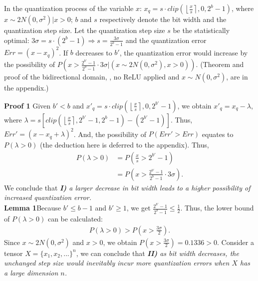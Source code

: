 \begin{theorem} 
In the quantization process of the variable $x$: $x_q = s\cdot clip(\left\lfloor\frac{x}{s}\right\rceil,0,2^b-1)$, where $x\sim 2N(0,\sigma^2)|  x>0$; $b$ and $s$ respectively denote the bit width and the quantization step size.  
Let the quantization step size $s$ be the statistically optimal: $3\sigma=s\cdot(2^b-1)\Rightarrow s=\frac{3\sigma}{2^b-1}$ and the quantization error $Err=(x-x_q)^2$. If $b$ decreases to $b'$, the quantization error would  
increase by the possibility of $P(x>\frac{2^{b'}-1}{2^{b}-1}\cdot3\sigma| (x\sim 2N(0,\sigma^2),  x>0)) $. 
(Theorem and proof of the bidirectional domain, \ie, no ReLU applied and $x\sim N(0,\sigma^2)$, are in the appendix.)
\end{theorem}
\textbf{Proof 1}\quad
Given $b'<b$ and $x'_q=s\cdot  clip(\left\lfloor\frac{x}{s}\right\rceil,0,2^{b'}-1)$, we obtain $x'_q = x_q - \lambda$, where  $\lambda=s[clip(\left\lfloor\frac{x}{s}\right\rceil,2^{b'}-1,2^b-1)-(2^{b'}-1)]$. Thus, $Err'=(x-x_q+\lambda)^2$. And, the possibility of $P(Err'>Err)$ equates to $P(\lambda > 0)$ (the deduction here is deferred to the appendix). Thus, 
\begin{equation}
\begin{split}
P(\lambda>0) &= P(\frac{x}{s}>2^{b'}-1)\\
&=P(x>\frac{2^{b'}-1}{2^{b}-1}\cdot 3\sigma).
\end{split}
\end{equation}
We conclude that \emph{\textbf{I)} a larger decrease in bit width leads to a higher possibility of increased quantization error.}
\\\textbf{Lemma 1}\quad  Because $b'\le b-1$ and $b'\ge1$, we get $\frac{2^{b'}-1}{2^{b}-1}\le \frac{1}{2}$. Thus, the lower bound of $P(\lambda>0)$ can be calculated:
\begin{equation}
\begin{split}
    P(\lambda>0) > P(x>\frac{3\sigma}{2} ).
\end{split}
\end{equation}
Since $x\sim 2N(0,\sigma^2)$ and $x>0$, we obtain $P(x>\frac{3\sigma}{2} ) = 0.1336>0$. Consider a tensor $X=\{x_1,x_2,...\}^n$, we can conclude that \emph{\textbf{II)}
as bit width decreases, the unchanged step
size would inevitably incur more quantization errors when $X$ has a large dimension $n$.}
